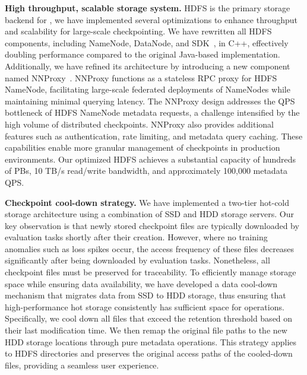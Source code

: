 \noindent \textbf{High throughput, scalable storage system.} HDFS is the primary storage backend for \sys{}, we have implemented several optimizations to enhance throughput and scalability for large-scale checkpointing.  We have rewritten all HDFS components, including NameNode, DataNode, and SDK~\cite{hdfs}, in C++, effectively doubling performance compared to the original Java-based implementation.
Additionally, we have refined its architecture 
by introducing a new component named NNProxy~\cite{nnproxy}.
NNProxy functions as a stateless RPC proxy for HDFS NameNode, facilitating large-scale federated deployments of NameNodes while maintaining minimal querying latency.
The NNProxy design addresses the 
QPS bottleneck of HDFS NameNode metadata requests, a challenge intensified by the high volume of distributed checkpoints.
NNProxy also provides additional features such as authentication, rate limiting, and metadata query caching. These capabilities enable more granular management of checkpoints in production environments.
Our optimized HDFS achieves a substantial capacity of hundreds of PBs, 10 TB/s read/write bandwidth, and approximately 100,000 metadata QPS.


\noindent \textbf{Checkpoint cool-down strategy.} We have implemented a two-tier hot-cold storage architecture using a combination of SSD and HDD storage servers.
Our key observation is that newly stored checkpoint files are typically downloaded by evaluation tasks shortly after their creation.
However, 
where no training anomalies such as loss spikes occur,
the access frequency of these files decreases significantly after being downloaded by evaluation tasks.
Nonetheless, all checkpoint files must be preserved for traceability.
To efficiently manage storage space while ensuring data availability, we have developed a data cool-down mechanism that migrates data from SSD to HDD storage, thus ensuring that high-performance hot storage consistently has sufficient space for operations.
Specifically, we cool down all files that exceed the retention threshold based on their last modification time. We then remap the original file paths to the new HDD storage locations through pure metadata operations.
This strategy applies to HDFS directories and preserves the original access paths of the cooled-down files, providing a seamless user experience.

